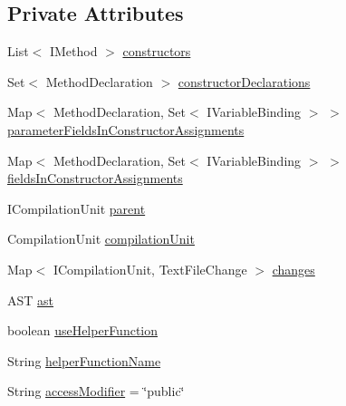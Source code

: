 \subsection*{Private Attributes}
\begin{DoxyCompactItemize}
\item 
List$<$ IMethod $>$ \hyperlink{classedu_1_1illinois_1_1canistelCassabanana_1_1RemoveDuplicateCodeInConstructorsRefactoring_a9d31c4c2b04e3ed5a8450714a08f1381}{constructors}
\item 
Set$<$ MethodDeclaration $>$ \hyperlink{classedu_1_1illinois_1_1canistelCassabanana_1_1RemoveDuplicateCodeInConstructorsRefactoring_a39607f363fde072a17c90ed499dd113b}{constructorDeclarations}
\item 
Map$<$ MethodDeclaration, Set$<$ IVariableBinding $>$ $>$ \hyperlink{classedu_1_1illinois_1_1canistelCassabanana_1_1RemoveDuplicateCodeInConstructorsRefactoring_a050a316f41a247e8477ef598a666ab22}{parameterFieldsInConstructorAssignments}
\item 
Map$<$ MethodDeclaration, Set$<$ IVariableBinding $>$ $>$ \hyperlink{classedu_1_1illinois_1_1canistelCassabanana_1_1RemoveDuplicateCodeInConstructorsRefactoring_af04c901de5714458dd9511acf45bd472}{fieldsInConstructorAssignments}
\item 
ICompilationUnit \hyperlink{classedu_1_1illinois_1_1canistelCassabanana_1_1RemoveDuplicateCodeInConstructorsRefactoring_acbe93b494e0487fdf5e6cc379b2fd0dc}{parent}
\item 
CompilationUnit \hyperlink{classedu_1_1illinois_1_1canistelCassabanana_1_1RemoveDuplicateCodeInConstructorsRefactoring_aa307d91c3347e0f99dca03fb3789e487}{compilationUnit}
\item 
Map$<$ ICompilationUnit, TextFileChange $>$ \hyperlink{classedu_1_1illinois_1_1canistelCassabanana_1_1RemoveDuplicateCodeInConstructorsRefactoring_af20942a1670a5ccd3debb4b0b10d629c}{changes}
\item 
AST \hyperlink{classedu_1_1illinois_1_1canistelCassabanana_1_1RemoveDuplicateCodeInConstructorsRefactoring_ab3b3926a515821596ed383f908c322c1}{ast}
\item 
boolean \hyperlink{classedu_1_1illinois_1_1canistelCassabanana_1_1RemoveDuplicateCodeInConstructorsRefactoring_ac3d10235e0a51b7d76e5a34233a842ae}{useHelperFunction}
\item 
String \hyperlink{classedu_1_1illinois_1_1canistelCassabanana_1_1RemoveDuplicateCodeInConstructorsRefactoring_aeec592ffa5b5903205515925d84c2bb8}{helperFunctionName}
\item 
String \hyperlink{classedu_1_1illinois_1_1canistelCassabanana_1_1RemoveDuplicateCodeInConstructorsRefactoring_ac98e605acbaebe4c90d19de7baae3798}{accessModifier} = \char`\"{}public\char`\"{}
\end{DoxyCompactItemize}


